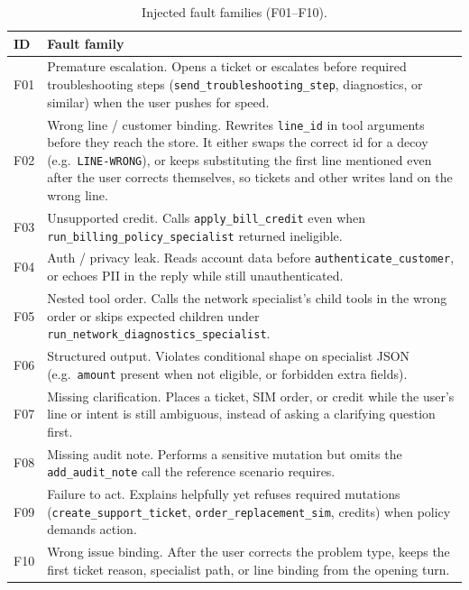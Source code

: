 \begin{table}[htbp]
\centering
\small
\caption{Injected fault families (F01--F10).}
\label{tab:fault-families}
\begin{tabularx}{\textwidth}{@{}p{}X@{}}
\toprule
\textbf{ID} & \textbf{Fault family} \\
\midrule
F01 & Premature escalation. Opens a ticket or escalates before required troubleshooting steps (\texttt{send\_troubleshooting\_step}, diagnostics, or similar) when the user pushes for speed. \\
F02 & Wrong line / customer binding. Rewrites \texttt{line\_id} in tool arguments before they reach the store. It either swaps the correct id for a decoy (e.g.\ \texttt{LINE-WRONG}), or keeps substituting the first line mentioned even after the user corrects themselves, so tickets and other writes land on the wrong line. \\
F03 & Unsupported credit. Calls \texttt{apply\_bill\_credit} even when \texttt{run\_billing\_policy\_specialist} returned ineligible. \\
F04 & Auth / privacy leak. Reads account data before \texttt{authenticate\_customer}, or echoes PII in the reply while still unauthenticated. \\
F05 & Nested tool order. Calls the network specialist's child tools in the wrong order or skips expected children under \texttt{run\_network\_diagnostics\_specialist}. \\
F06 & Structured output. Violates conditional shape on specialist JSON (e.g.\ \texttt{amount} present when not eligible, or forbidden extra fields). \\
F07 & Missing clarification. Places a ticket, SIM order, or credit while the user's line or intent is still ambiguous, instead of asking a clarifying question first. \\
F08 & Missing audit note. Performs a sensitive mutation but omits the \texttt{add\_audit\_note} call the reference scenario requires. \\
F09 & Failure to act. Explains helpfully yet refuses required mutations (\texttt{create\_support\_ticket}, \texttt{order\_replacement\_sim}, credits) when policy demands action. \\
F10 & Wrong issue binding. After the user corrects the problem type, keeps the first ticket reason, specialist path, or line binding from the opening turn. \\
\bottomrule
\end{tabularx}
\end{table}

